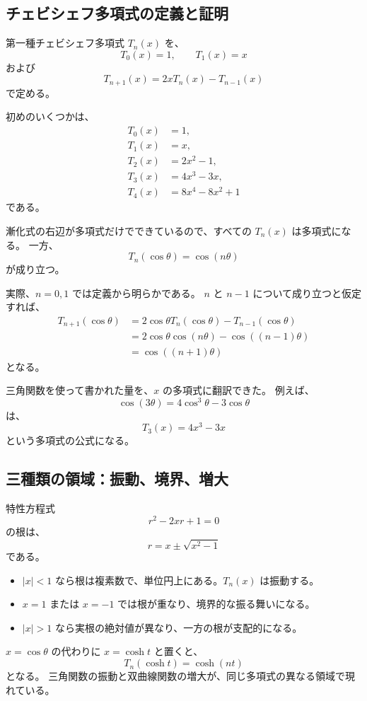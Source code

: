\subsection{チェビシェフ多項式の定義と証明}

第一種チェビシェフ多項式 $T_n(x)$ を、
\[
  T_0(x)=1,\qquad T_1(x)=x
\]
および
\[
  T_{n+1}(x)=2xT_n(x)-T_{n-1}(x)
\]
で定める。

初めのいくつかは、
\[
\begin{aligned}
  T_0(x)&=1,\\
  T_1(x)&=x,\\
  T_2(x)&=2x^2-1,\\
  T_3(x)&=4x^3-3x,\\
  T_4(x)&=8x^4-8x^2+1
\end{aligned}
\]
である。

漸化式の右辺が多項式だけでできているので、すべての $T_n(x)$ は多項式になる。
一方、
\[
  T_n(\cos\theta)=\cos(n\theta)
\]
が成り立つ。

実際、$n=0,1$ では定義から明らかである。
$n$ と $n-1$ について成り立つと仮定すれば、
\[
\begin{aligned}
  T_{n+1}(\cos\theta)
  &=2\cos\theta T_n(\cos\theta)-T_{n-1}(\cos\theta)\\
  &=2\cos\theta\cos(n\theta)-\cos((n-1)\theta)\\
  &=\cos((n+1)\theta)
\end{aligned}
\]
となる。

三角関数を使って書かれた量を、$x$ の多項式に翻訳できた。
例えば、
\[
  \cos(3\theta)=4\cos^3\theta-3\cos\theta
\]
は、
\[
  T_3(x)=4x^3-3x
\]
という多項式の公式になる。

\subsection{三種類の領域：振動、境界、増大}

特性方程式
\[
  r^2-2xr+1=0
\]
の根は、
\[
  r=x\pm\sqrt{x^2-1}
\]
である。

\begin{itemize}
  \item $|x|<1$ なら根は複素数で、単位円上にある。$T_n(x)$ は振動する。
  \item $x=1$ または $x=-1$ では根が重なり、境界的な振る舞いになる。
  \item $|x|>1$ なら実根の絶対値が異なり、一方の根が支配的になる。
\end{itemize}

$x=\cos\theta$ の代わりに $x=\cosh t$ と置くと、
\[
  T_n(\cosh t)=\cosh(nt)
\]
となる。
三角関数の振動と双曲線関数の増大が、同じ多項式の異なる領域で現れている。

